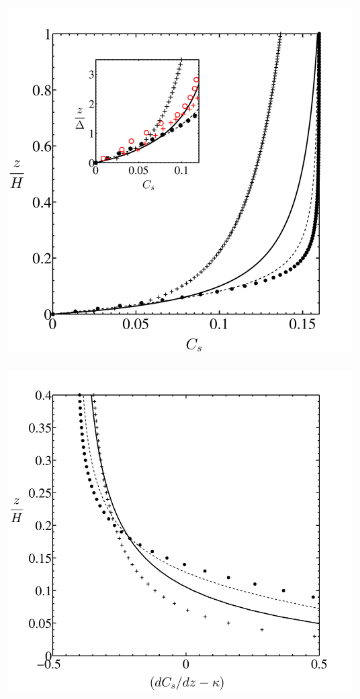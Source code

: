 \begin{figure}
\centering
        \begin{subfigure}[t]{0.5\textwidth}
                \includegraphics[width=\linewidth]{Figure/Smag2b.pdf}
                \caption{}
                \label{fig:figure_smag}
        \end{subfigure}%
        \centering
        \begin{subfigure}[t]{0.5\textwidth}
                \includegraphics[width=\linewidth]{Figure/Smag2b_der.pdf}

\end{subfigure}
\end{figure}

